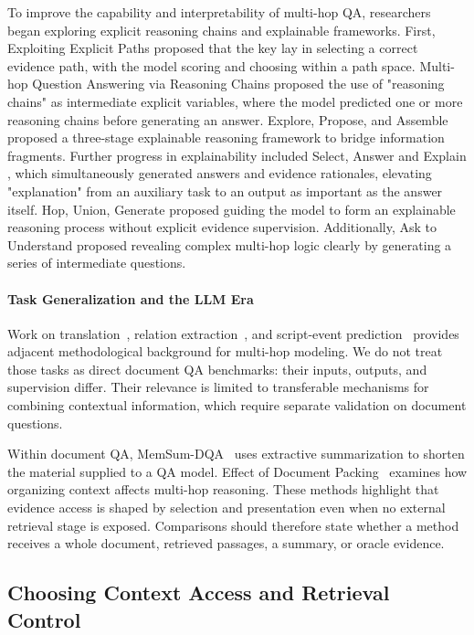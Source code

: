 To improve the capability and interpretability of multi-hop QA, researchers began exploring explicit reasoning chains and explainable frameworks. First, Exploiting Explicit Paths \cite{explicitpaths2019} proposed that the key lay in selecting a correct evidence path, with the model scoring and choosing within a path space. Multi-hop Question Answering via Reasoning Chains \cite{reasoningchains2020} proposed the use of "reasoning chains" as intermediate explicit variables, where the model predicted one or more reasoning chains before generating an answer. Explore, Propose, and Assemble \cite{epa2019} proposed a three-stage explainable reasoning framework to bridge information fragments. Further progress in explainability included Select, Answer and Explain \cite{sae2020}, which simultaneously generated answers and evidence rationales, elevating "explanation" from an auxiliary task to an output as important as the answer itself. Hop, Union, Generate \cite{hug2023} proposed guiding the model to form an explainable reasoning process without explicit evidence supervision. Additionally, Ask to Understand \cite{asktounderstand2023} proposed revealing complex multi-hop logic clearly by generating a series of intermediate questions.

\paragraph{Task Generalization and the LLM Era}
Work on translation~\cite{multihoptransformer2021}, relation extraction~\cite{syntaxmultihop2024}, and script-event prediction~\cite{docscript2024} provides adjacent methodological background for multi-hop modeling. We do not treat those tasks as direct document QA benchmarks: their inputs, outputs, and supervision differ. Their relevance is limited to transferable mechanisms for combining contextual information, which require separate validation on document questions.

Within document QA, MemSum-DQA~\cite{memsumdqa2023} uses extractive summarization to shorten the material supplied to a QA model. Effect of Document Packing~\cite{documentpacking2025} examines how organizing context affects multi-hop reasoning. These methods highlight that evidence access is shaped by selection and presentation even when no external retrieval stage is exposed. Comparisons should therefore state whether a method receives a whole document, retrieved passages, a summary, or oracle evidence.

\subsection{Choosing Context Access and Retrieval Control}

